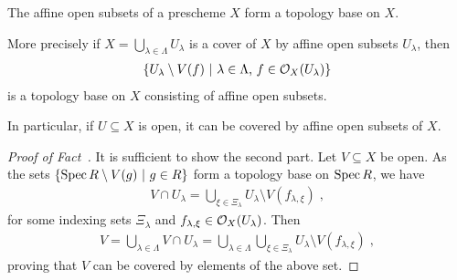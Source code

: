 \documentclass[a4paper,parskip=half,numbers=enddot, DIV=12]{scrreprt}
\begin{document}
\begin{fact}
	\begin{alphanumerate}
		\item {} The affine open subsets of a prescheme $X$ form a topology base on $X$.
		\item More precisely if $X=\bigcup_{\lambda\in \Lambda} U_\lambda$ is a cover of $X$ by affine open subsets $U_\lambda$, then 
		\begin{align*}
		\left\{U_\lambda\setminus V(f)\ \middle|\  \lambda\in \Lambda\text{, }f\in \mathcal{O}_X(U_\lambda)\right\}
		\end{align*}
		is a topology base on $X$ consisting of affine open subsets.
	\end{alphanumerate}
\end{fact}
\begin{rem*}
    In particular, if $U\subseteq X$ is open, it can be covered by affine open subsets of $X$. 
\end{rem*}
\begin{proof}[Proof of Fact~]
    It is sufficient to show the second part. Let $V\subseteq X$ be open. As the sets $\left\{\operatorname{Spec} R\setminus V(g)\ \middle|\  g\in R\right\}$ form a topology base on $\operatorname{Spec} R$, we have
    \begin{align*}
    	V\cap U_\lambda = \bigcup_{\xi\in\Xi_\lambda} U_\lambda \setminus V(f_{\lambda,\xi})\;, 
    \end{align*}
    for some indexing sets $\Xi_\lambda$ and $f_{\lambda,\xi}\in \mathcal{O}_X(U_\lambda)$. Then 
    \begin{align*}
    	V= \bigcup_{\lambda\in\Lambda} V\cap U_\lambda= \bigcup_{\lambda\in \Lambda} \bigcup_{\xi\in\Xi_\lambda} U_\lambda\setminus V(f_{\lambda,\xi})\;,
    \end{align*}
    proving that $V$ can be covered by elements of the above set.
\end{proof}
\end{document}
